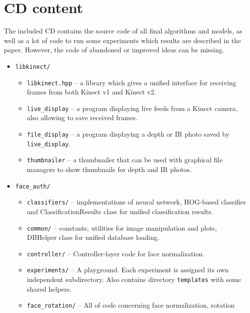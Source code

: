 \chapter{CD content}
    The included CD contains the source code of all final algorithms
    and models, as well as a lot of code to run some experiments
    which results are described in the paper.
    However, the code of abandoned or improved ideas can be missing.

    \begin{itemize}
        \item \texttt{libkinect/}
        \begin{itemize}
            \item \texttt{libkinect.hpp} -- a library which gives a unified interface
                  for receiving frames from both Kinect v1 and Kinect v2.
            \item \texttt{live\_display} -- a program displaying live feeds from a Kinect
                  camera, also allowing to save received frames.
            \item \texttt{file\_display} -- a program displaying a depth or IR photo saved
                  by \texttt{live\_display}.
            \item \texttt{thumbnailer} -- a thumbnailer that can be used with graphical
                  file managers to show thumbnails for depth and IR photos.
        \end{itemize}
        \item \texttt{face\_auth/}
        \begin{itemize}
            \item \texttt{classifiers/} -- implementations of neural network,
                  HOG-based classifier and ClassificationResults class for
                  unified classification results.
            \item \texttt{common/} -- constants, utilities for image manipulation and plots,
                  DBHelper class for unified database loading.
            \item \texttt{controller/} -- Controller-layer code for face normalization.
            \item \texttt{experiments/} -- A playground. Each experiment is assigned its
                  own independent subdirectory. Also contains directory \texttt{templates}
                  with some shared helpers.
            \item \texttt{face\_rotation/} -- All of code concerning face normalization, rotation

\end{itemize}
\end{itemize}
